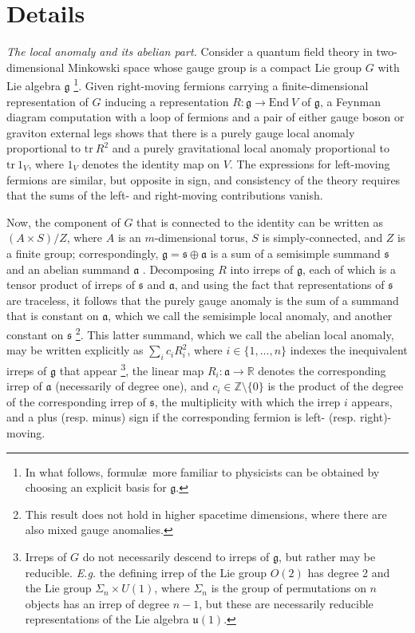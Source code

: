 \documentclass[11pt,a4paper]{article}
\begin{document}
	\section{Details}\label{section:nit}
        {\em The local anomaly and its abelian part.} Consider a quantum field theory in two-dimensional Minkowski space whose gauge group is a compact Lie group $G$ with Lie algebra  $\mathfrak{g}$ \footnote{In what follows, formul\ae\ more familiar to physicists can be obtained by choosing an explicit basis for $\mathfrak{g}$.}. 
Given right-moving fermions carrying a finite-dimensional representation of $G$ inducing a representation $R: \mathfrak{g} \to \mathrm{End}\ V$ of $\mathfrak{g}$, 
a Feynman diagram computation with a loop of fermions and a pair of  either gauge boson or graviton external legs shows that there is a purely gauge local anomaly proportional to $\mathrm{tr}\ R^2$ and a purely gravitational local anomaly proportional to $\mathrm{tr}\ 1_V$, where $1_V$ denotes the identity map on $V$. The expressions for left-moving fermions are similar, but opposite in sign, and consistency of the theory requires that the sums of the left- and right-moving contributions vanish.

Now, the component of $G$ that is connected to the identity can be written as $(A \times S)/Z$, where $A$ is an $m$-dimensional torus, $S$ is simply-connected, and $Z$ is a finite group; correspondingly, 
$\mathfrak{g}= \mathfrak{s} \oplus \mathfrak{a}$ is a sum of a semisimple summand $\mathfrak{s}$ and an abelian summand $\mathfrak{a}$ \cite{HofmannKarlHeinrich2013Tsoc}. Decomposing $R$ into irreps of $\mathfrak{g}$, each of which is a tensor product of irreps of $\mathfrak{s}$ and $\mathfrak{a}$, and using the fact that representations of $\mathfrak{s}$ are traceless, it follows that the purely gauge anomaly is the sum of a summand that is constant on $\mathfrak{a}$, which we call the semisimple local anomaly, and another constant on $\mathfrak{s}$ \footnote{This result does not hold in higher spacetime dimensions, where there are also mixed gauge anomalies.}. This latter summand, which we call the abelian local anomaly, may be written explicitly as $\sum_i c_i R_i^2$, where $i \in \{1,\dots,n\}$ indexes the inequivalent irreps of $\mathfrak{g}$ that appear \footnote{Irreps of $G$ do not necessarily descend to irreps of $\mathfrak{g}$, but rather may be reducible. {\em E.g.} the defining irrep of the Lie group $O(2)$ has degree 2 and the Lie group $\Sigma_n \times U(1)$, where $\Sigma_n$ is the group of permutations on $n$ objects has an irrep of degree $n-1$, but these are necessarily reducible representations of the Lie algebra $\mathfrak{u}(1)$.}, the linear map $R_i: \mathfrak{a} \to \mathbb{R}$ denotes the corresponding irrep of $\mathfrak{a}$ (necessarily of degree one), and $c_i \in \mathbb{Z}\setminus\{0 \}$ is the product of the degree of the corresponding irrep of $\mathfrak{s}$, the multiplicity with which the irrep $i$ appears, and a plus (resp. minus) sign if the corresponding fermion is left- (resp. right)-moving. 
\end{document}
